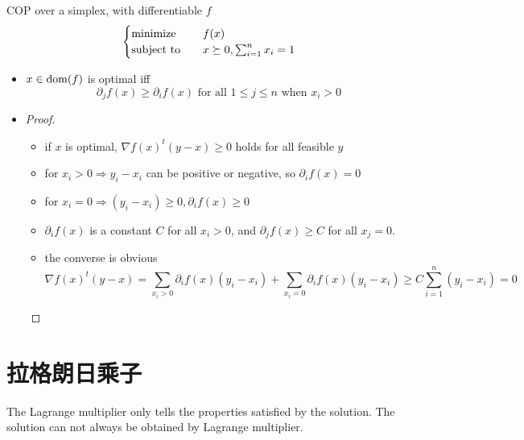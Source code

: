 \begin{remark}
    COP over a simplex, with differentiable $f$
    \[\begin{cases}
        \operatorname{minimize} \quad &f(x)\\
        \operatorname{subject\ to} \quad &x \succeq 0, \sum_{i = 1}^nx_i = 1
    \end{cases}\]
    \begin{itemize}
        \item $x \in \operatorname{dom}(f)$ is optimal iff\[\partial_jf(x) \ge \partial_if(x)\text{ for all } 1 \le j \le n \text{ when } x_i > 0\]
        \item \begin{proof}
            \begin{itemize}
                \item if $x$ is optimal, $\nabla f(x)^t(y - x) \ge 0$ holds for all feasible $y$
                \item for $x_i > 0 \Longrightarrow y_i - x_i$ can be positive or negative, so $\partial_i f(x) = 0$
                \item for $x_i = 0 \Longrightarrow (y_i - x_i) \ge 0, \partial_i f(x) \ge 0$
                \item $\partial_if(x)$ is a constant $C$ for all $x_i > 0$, and $\partial_jf(x) \ge C$ for all $x_j = 0$.
                \item the converse is obvious\[\nabla f(x)^t(y - x) = \sum_{x_i > 0}\partial_i f(x)(y_i - x_i) + \sum_{x_i = 0}\partial_i f(x)(y_i - x_i) \ge C\sum_{i = 1}^n(y_i - x_i) = 0\]
            \end{itemize}
        \end{proof}
    \end{itemize}
\end{remark}

\section{拉格朗日乘子}
\begin{remark}
    The Lagrange multiplier only tells the properties satisfied by the solution. The solution can not always be obtained by Lagrange multiplier.
\end{remark}

